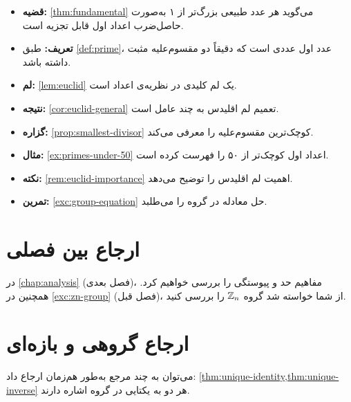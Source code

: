 \documentclass{matinbook}
\begin{document}
\begin{itemize}
    \item \textbf{قضیه:} \cref{thm:fundamental} می‌گوید هر
    عدد طبیعی بزرگ‌تر از ۱ به‌صورت حاصل‌ضرب اعداد اول
    قابل تجزیه است.

    \item \textbf{تعریف:} طبق \cref{def:prime}، عدد اول
    عددی است که دقیقاً دو مقسوم‌علیه مثبت داشته باشد.

    \item \textbf{لم:} \cref{lem:euclid} یک لم کلیدی در
    نظریه‌ی اعداد است.

    \item \textbf{نتیجه:} \cref{cor:euclid-general} تعمیم
    لم اقلیدس به چند عامل است.

    \item \textbf{گزاره:} \cref{prop:smallest-divisor}
    کوچک‌ترین مقسوم‌علیه را معرفی می‌کند.

    \item \textbf{مثال:} \cref{ex:primes-under-50} اعداد
    اول کوچک‌تر از ۵۰ را فهرست کرده است.

    \item \textbf{نکته:} \cref{rem:euclid-importance}
    اهمیت لم اقلیدس را توضیح می‌دهد.

    \item \textbf{تمرین:} \cref{exc:group-equation} حل
    معادله در گروه را می‌طلبد.
\end{itemize}

\section{ارجاع بین فصلی}
\label{sec:cref-cross-chapter}

در \cref{chap:analysis} (فصل بعدی)، مفاهیم حد و پیوستگی
را بررسی خواهیم کرد. همچنین در \cref{exc:zn-group}
(فصل قبل)، از شما خواسته شد گروه $\mathbb{Z}_{n}$ را بررسی کنید.

\section{ارجاع گروهی و بازه‌ای}
\label{sec:cref-group}

می‌توان به چند مرجع به‌طور هم‌زمان ارجاع داد:
\cref{thm:unique-identity,thm:unique-inverse} هر دو به
یکتایی در گروه اشاره دارند.

\end{document}
